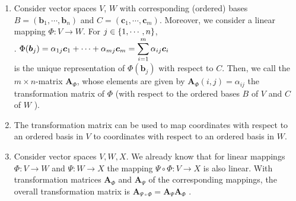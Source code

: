 \begin{enumerate}
    \item 
    \begin{definition}
        Consider vector spaces $V$, $W$ with corresponding (ordered) bases $B = (\bm{b}_1, \cdots , \bm{b}_n)$ and $C = (\bm{c}_1, \cdots , \bm{c}_m)$. 
        Moreover, we consider a linear mapping $\Phi : V \to W$. 
        For $j \in \left\{1, \cdots , n\right\}$,
        \hfill \cite{mfml/book/mml/Deisenroth-Faisal-Ong}
        \\
        .\hfill
        $
            \Phi(\bm{b}_j ) = \alpha _{1j} \bm{c}_1 + \cdots + \alpha _{mj} \bm{c}_m 
            = \displaystyle\sum^m_{i=1} \alpha _{ij} \bm{c}_i
        $
        \hfill \cite{mfml/book/mml/Deisenroth-Faisal-Ong}
        \\
        is the unique representation of $\Phi(\bm{b}_j )$ with respect to $C$. 
        Then, we call the $m \times n$-matrix $\bm{A}_\Phi$, whose elements are given by $\bm{A}_\Phi(i, j) = \alpha_{ij}$ the transformation matrix of $\Phi$ (with respect to the ordered bases $B$ of $V$ and $C$ of $W$  ).
        \hfill \cite{mfml/book/mml/Deisenroth-Faisal-Ong}
    \end{definition}

    \item The transformation matrix can be used to map coordinates with respect to an ordered basis in $V$ to coordinates with respect to an ordered basis in $W$.
    \hfill \cite{mfml/book/mml/Deisenroth-Faisal-Ong}

    \item Consider vector spaces $V, W, X$. 
    We already know that for linear mappings $\Phi  : V \to  W$ and $\Psi : W \to  X$ the mapping $\Psi \circ \Phi  : V \to  X$ is also linear. 
    With transformation matrices $\bm{A}_\Phi$  and $\bm{A}_\Psi$ of the corresponding mappings, the overall transformation matrix is $\bm{A}_{\Psi\circ\Phi}  = \bm{A}_\Psi \bm{A}_\Phi$ .
    \hfill \cite{mfml/book/mml/Deisenroth-Faisal-Ong}


\end{enumerate}
